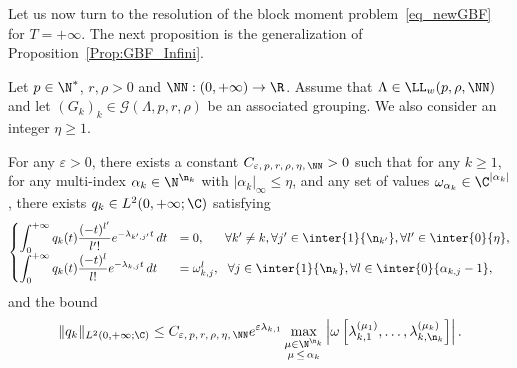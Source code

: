 Let us now turn to the resolution of the block moment problem~\eqref{eq_newGBF} for $T=+\infty$. The next proposition is the generalization of Proposition~\ref{Prop:GBF_Infini}.

\begin{prop}\label{Prop:newGBF_Infini}
Let $p \in \N^*$, $r, \rho > 0$ and $\NN : (0,+\infty) \to \R$. Assume that $\Lambda \in \LL_w(p,\rho, \NN)$ and let $(G_k)_k\in \mathcal{G}(\Lambda,p,r,\rho)$ be an associated grouping. We also consider an integer $\eta\geq 1$.

For any $\varepsilon > 0$, there exists a constant $C_{\varepsilon,\, p, \,r, \,\rho,\, \eta,\, \NN} >0$ such that for any $k \geq 1$, for any multi-index $\alpha_k\in \N^{\n_k}$ with $|\alpha_k|_\infty\leq \eta$, and any set of values $\omega_{\alpha_k} \in \C^{|\alpha_k|}$, there exists $q_k \in L^2(0,+\infty; \C)$ satisfying
\begin{equation*}\label{eq_newGBF_Infini}
\begin{cases}
\displaystyle\int_0^{+\infty} q_k(t) \frac{(-t)^{l'}}{l'!} e^{-\lambda_{k',j'}t} \, dt & = 0, \mkern30mu \forall k'\neq k, \forall j'\in \inter{1}{\n_{k'}}, \forall l'\in \inter{0}{\eta},\\[0.15em]
\displaystyle\int_0^{+\infty} q_k(t) \frac{(-t)^l}{l!} e^{-\lambda_{k,j}t} \, dt & = \omega_{k,j}^l, \ \ \forall j\in \inter{1}{\n_{k}}, \forall l\in \inter{0}{\alpha_{k,j}-1},\\
\end{cases}
\end{equation*}
and the bound
\begin{equation}\label{bound_qk_multiplicities_Infini}
\|q_k\|_{L^2(0,+\infty;\C)}\leq C_{\varepsilon,\, p,\, r,\, \rho,\, \eta,\, \NN} e^{\varepsilon \lambda_{k,1}} \max\limits_{\substack{\mu\in \N^{\n_k} \\ \mu\,\leq\,\alpha_k}} \left| \omega\left[\lambda_{k,1}^{(\mu_1)},\dotsc,\lambda_{k,\n_k}^{(\mu_k)}\right] \right|.
\end{equation}
\end{prop}

